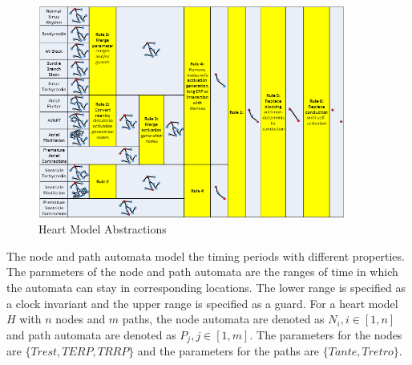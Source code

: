 \begin{figure}[!t]
		\centering
		\includegraphics[width=0.9\textwidth]{figs/rule.png}
		\caption{\small Heart Model Abstractions}
		\label{fig:abs}
\end{figure}


The node and path automata model the timing periods with different properties. The parameters of the node and path automata are the ranges of time in which the automata can stay in corresponding locations. The lower range is specified as a clock invariant and the upper range is specified as a guard. For a heart model $H$ with $n$ nodes and $m$ paths, the node automata are denoted as $N_i, i\in[1,n]$ and path automata are denoted as $P_j,j\in[1,m]$. The parameters for the nodes are $\{Trest,TERP,TRRP\}$ and the parameters for the paths are $\{Tante,Tretro\}$. 

